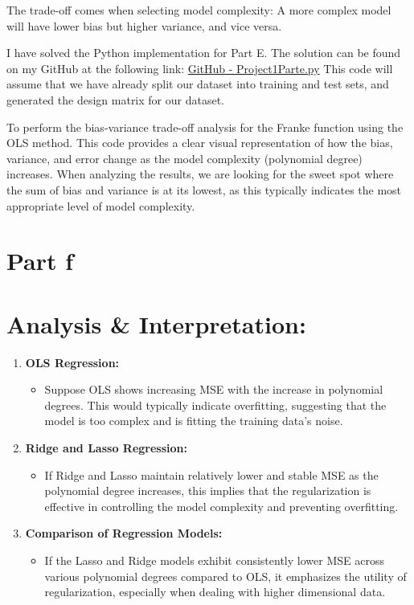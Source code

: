 \documentclass{article}
\begin{document}
The trade-off comes when selecting model complexity: A more complex model will have lower bias but higher variance, and vice versa.

I have solved the Python implementation for Part E. The solution can be found on my GitHub at the following link: \href{https://github.com/SheikAbdullahi/MachineLearning/blob/main/Project1/Project1Parte.py}{GitHub - Project1Parte.py}
This code will assume that we have already split our dataset into training and test sets, and generated the design matrix for our dataset.



To perform the bias-variance trade-off analysis for the Franke function using the OLS method. This code provides a clear visual representation of how the bias, variance, and error change as the model complexity (polynomial degree) increases. When analyzing the results, we are looking for the sweet spot where the sum of bias and variance is at its lowest, as this typically indicates the most appropriate level of model complexity.


\section*{Part f}


\section*{Analysis \& Interpretation:}

\begin{enumerate}[label=\arabic*.]
   \item \textbf{OLS Regression:}
      \begin{itemize}
         \item Suppose OLS shows increasing MSE with the increase in polynomial degrees. This would typically indicate overfitting, suggesting that the model is too complex and is fitting the training data's noise.
      \end{itemize}

   \item \textbf{Ridge and Lasso Regression:}
      \begin{itemize}
         \item If Ridge and Lasso maintain relatively lower and stable MSE as the polynomial degree increases, this implies that the regularization is effective in controlling the model complexity and preventing overfitting.
      \end{itemize}

   \item \textbf{Comparison of Regression Models:}
      \begin{itemize}
         \item If the Lasso and Ridge models exhibit consistently lower MSE across various polynomial degrees compared to OLS, it emphasizes the utility of regularization, especially when dealing with higher dimensional data.
      \end{itemize}
\end{enumerate}
\end{document}
